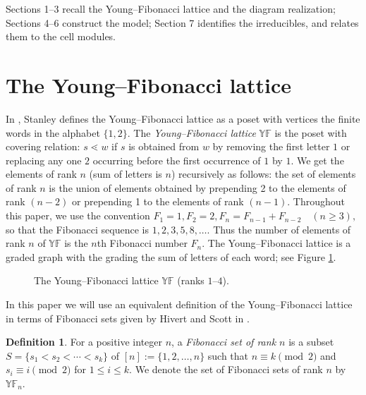 \documentclass[12pt,reqno]{amsart}
\numberwithin{equation}{section}
\theoremstyle{definition}
\newtheorem{definition}[theorem]{Definition}
\theoremstyle{definition}
\newcommand{\YF}{\mathbb{YF}}
\begin{document}
Sections 1--3 recall the Young--Fibonacci lattice and the diagram realization; Sections 4--6 construct the model; Section 7 identifies the irreducibles, and relates them to the cell modules. 
 
\section{The Young--Fibonacci lattice}


In \cite{StanleyDifferential}, Stanley defines the Young--Fibonacci lattice as a poset with vertices the finite words in the alphabet $\{1,2\}$. 
The \emph{Young--Fibonacci lattice} $\YF$ is the poset with covering relation:
$s\lessdot w$ if $s$ is obtained from $w$ by removing the first letter $1$ or
replacing any one $2$ occurring before the first occurrence of $1$ by $1$. We get the elements of rank $n$ (sum of letters is $n$) recursively as follows: the set of elements of rank $n$ is the union of elements obtained by prepending 2 to the elements of rank $(n-2)$ or prepending 1 to the elements of rank $(n-1)$. Throughout this paper, we use the convention $
F_1=1,F_2=2, F_n=F_{n-1}+F_{n-2}\quad (n\geq 3),$
so that the Fibonacci sequence is $1,2,3,5,8,\ldots.$
Thus the number of elements of rank $n$ of $\YF$ is the $n$th Fibonacci number $F_n$.
The Young--Fibonacci lattice is a graded graph with the grading the sum of letters of each word; see Figure \ref{YF1}.
\begin{figure}[ht]
\centering
{}
\caption{The Young--Fibonacci lattice $\YF$ (ranks $1$--$4$).}
\label{YF1}
\end{figure}


 In this paper we will use an equivalent definition of the Young--Fibonacci lattice in terms of Fibonacci sets given by Hivert and Scott in \cite{Hivert-Scott}. 
\begin{definition}
    For a positive integer $n$, a \emph{Fibonacci set of rank $n$} is a subset $S=\{s_1<s_2<\cdots<s_k\}$ of $[n]:=\{1,2,\ldots,n\}$ such that $n \equiv k\pmod 2 $ and $s_i \equiv i \pmod 2$ for $1 \leq i \leq k$. We denote the set of Fibonacci sets of rank $n$ by $\YF_n$.
\end{definition}
\end{document}
